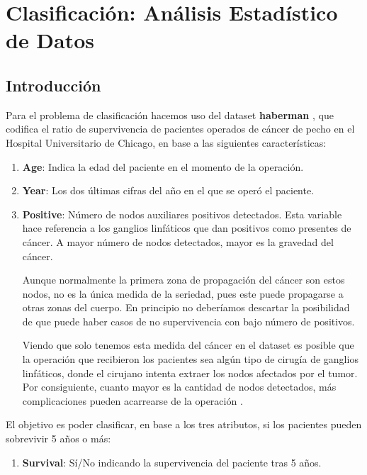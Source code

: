 \section{Clasificación: Análisis Estadístico de Datos}

\subsection{Introducción}

Para el problema de clasificación hacemos uso del dataset \textbf{haberman} \cite{haberman}, que codifica el ratio de supervivencia de pacientes operados de cáncer de pecho en el Hospital Universitario de Chicago, en base a las siguientes características:

\begin{enumerate}
\def\labelenumi{\arabic{enumi}.}
    \item \textbf{Age}: Indica la edad del paciente en el momento de la operación.
    \item \textbf{Year}: Los dos últimas cifras del año en el que se operó el paciente.
    \item \textbf{Positive}: Número de nodos auxiliares positivos detectados. Esta variable hace referencia a los ganglios linfáticos que dan positivos como presentes de cáncer. A mayor número de nodos detectados, mayor es la gravedad del cáncer. 
    
    Aunque normalmente la primera zona de propagación del cáncer son estos nodos, no es la única medida de la seriedad, pues este puede propagarse a otras zonas del cuerpo. En principio no deberíamos descartar la posibilidad de que puede haber casos de no supervivencia con bajo número de positivos.

    Viendo que solo tenemos esta medida del cáncer en el dataset es posible que la operación que recibieron los pacientes sea algún tipo de cirugía de ganglios linfáticos, donde el cirujano intenta extraer los nodos afectados por el tumor. Por consiguiente, cuanto mayor es la cantidad de nodos detectados, más complicaciones pueden acarrearse de la operación \cite{cancer1, cancer2}.
\end{enumerate}

El objetivo es poder clasificar, en base a los tres atributos, si los pacientes pueden sobrevivir 5 años o más:

\begin{enumerate}
    \def\labelenumi{\arabic{enumi}.}
    \setcounter{enumi}{3}
    \item \textbf{Survival}: Sí/No indicando la supervivencia del paciente tras 5 años.
\end{enumerate}


